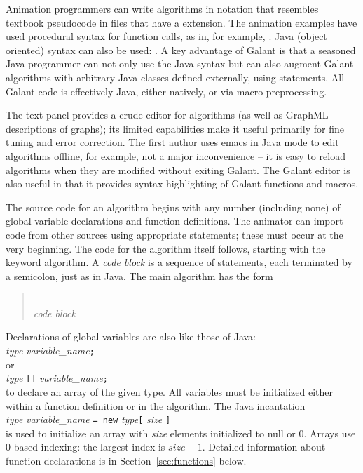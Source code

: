 Animation programmers can write algorithms in notation that resembles
textbook pseudocode
in files that have a  extension.
The animation examples have used procedural syntax for function calls, as in, for example,
.
Java (object oriented) syntax can also be used: .
A key advantage of Galant is that a seasoned Java programmer can
not only use the Java syntax but can also augment Galant algorithms with
arbitrary Java classes defined externally, using  statements.
All Galant code is effectively Java, either natively, or via macro preprocessing.

The text panel provides a crude editor for algorithms (as well as GraphML
descriptions of graphs);
its limited capabilities make it useful primarily for fine tuning and error correction.
The first author uses emacs in Java mode to edit algorithms offline, for example,
not a major inconvenience -- it is easy to reload algorithms when they are modified
without exiting Galant.
The Galant editor is also useful in that it provides syntax highlighting of Galant
functions and macros.

The source code for an algorithm begins with any number (including none)
of global variable declarations and function definitions.
The animator can import code from other sources using appropriate
 statements; these must occur at the very beginning.
The code for the algorithm itself follows, starting with the keyword
\textsf{algorithm}.
A \emph{code block}
is a sequence of statements, each terminated by a semicolon, just as in
Java.
The main algorithm has the form
\begin{quote}
\\
\hspace*{2em}\emph{code block}\\
\Code{\}}
\end{quote}

Declarations of global variables are also like those of Java:\\
\hspace*{1em}\emph{type} \emph{variable\_name}\texttt{;}\\
or\\
\hspace*{1em}\emph{type} \texttt{[]} \emph{variable\_name}\texttt{;}\\
to declare an array of the given type.
All variables must be initialized either within a function definition or
in the algorithm.
The Java incantation\\
\hspace*{1em}\emph{type} \emph{variable\_name}
\texttt{= new} \emph{type}\texttt{[} \emph{size} \texttt{]}\\
is used to initialize an array with \emph{size} elements initialized to \textsf{null}
or 0.
Arrays use 0-based indexing: the largest index is $\mathit{size} - 1$.
Detailed
information about function declarations is in Section~\ref{sec:functions}
below.

